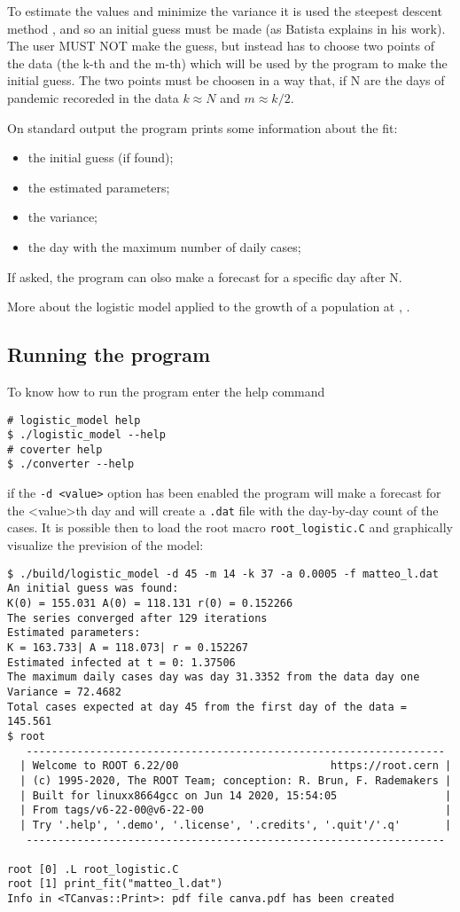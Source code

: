 To estimate the values and minimize the variance  it is used the steepest descent method \cite{wikipedia : steepest}, and so an initial guess must be made (as Batista explains in his work). The user MUST NOT make the guess, but instead has to choose two points of the data (the k-th and the m-th) which will be used by the program to make the initial guess. The two points must be choosen in a way that, if N are the days of pandemic recoreded in the data $k \approx N$ and $m \approx k/2$.

On standard output the program prints some information about the fit: 
\begin{itemize}
\item  the initial guess (if found);
\item the estimated parameters;
\item the variance;
\item the day with the maximum number of daily cases;
\end{itemize}
If asked, the program can olso make a forecast for a specific day after N.

More about the logistic model applied to the growth of a population at \cite{Gaeta : Modelli matematici}, \cite{wikipedia : logistic}.

\subsection{Running the program}

To know how to run the program enter the help command
\begin{verbatim}
# logistic_model help
$ ./logistic_model --help
# coverter help
$ ./converter --help
\end{verbatim}
if the \verb!-d <value>! option has been enabled the program will make a forecast for the <value>th day and will create a \verb!.dat! file with the day-by-day count of the cases. It is possible then to load the root macro \verb!root_logistic.C! and  graphically visualize the prevision of the model:
\begin{verbatim}
$ ./build/logistic_model -d 45 -m 14 -k 37 -a 0.0005 -f matteo_l.dat
An initial guess was found:
K(0) = 155.031 A(0) = 118.131 r(0) = 0.152266
The series converged after 129 iterations
Estimated parameters:
K = 163.733| A = 118.073| r = 0.152267
Estimated infected at t = 0: 1.37506
The maximum daily cases day was day 31.3352 from the data day one
Variance = 72.4682
Total cases expected at day 45 from the first day of the data = 145.561
$ root
   ------------------------------------------------------------------
  | Welcome to ROOT 6.22/00                        https://root.cern |
  | (c) 1995-2020, The ROOT Team; conception: R. Brun, F. Rademakers |
  | Built for linuxx8664gcc on Jun 14 2020, 15:54:05                 |
  | From tags/v6-22-00@v6-22-00                                      |
  | Try '.help', '.demo', '.license', '.credits', '.quit'/'.q'       |
   ------------------------------------------------------------------

root [0] .L root_logistic.C
root [1] print_fit("matteo_l.dat")
Info in <TCanvas::Print>: pdf file canva.pdf has been created
\end{verbatim}

